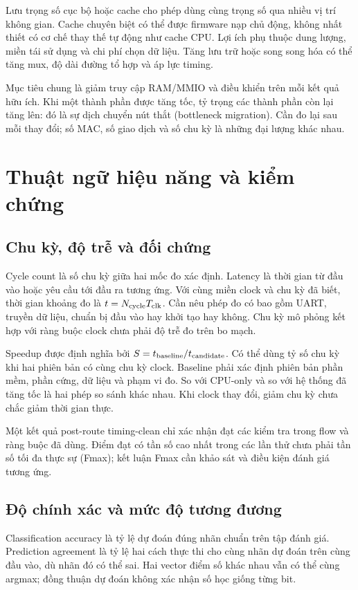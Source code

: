 Lưu trọng số cục bộ hoặc cache cho phép dùng cùng trọng số qua nhiều vị trí không gian. Cache chuyên biệt có thể được firmware nạp chủ động, không nhất thiết có cơ chế thay thế tự động như cache CPU. Lợi ích phụ thuộc dung lượng, miền tái sử dụng và chi phí chọn dữ liệu. Tăng lưu trữ hoặc song song hóa có thể tăng mux, độ dài đường tổ hợp và áp lực timing.

Mục tiêu chung là giảm truy cập RAM/MMIO và điều khiển trên mỗi kết quả hữu ích. Khi một thành phần được tăng tốc, tỷ trọng các thành phần còn lại tăng lên: đó là sự dịch chuyển nút thắt (bottleneck migration). Cần đo lại sau mỗi thay đổi; số MAC, số giao dịch và số chu kỳ là những đại lượng khác nhau.

\section{Thuật ngữ hiệu năng và kiểm chứng}
\subsection{Chu kỳ, độ trễ và đối chứng}
Cycle count là số chu kỳ giữa hai mốc đo xác định. Latency là thời gian từ đầu vào hoặc yêu cầu tới đầu ra tương ứng. Với cùng miền clock và chu kỳ đã biết, thời gian khoảng đo là $t=N_{\rm cycle}T_{\rm clk}$. Cần nêu phép đo có bao gồm UART, truyền dữ liệu, chuẩn bị đầu vào hay khởi tạo hay không. Chu kỳ mô phỏng kết hợp với ràng buộc clock chưa phải độ trễ đo trên bo mạch.

Speedup được định nghĩa bởi $S=t_{\rm baseline}/t_{\rm candidate}$. Có thể dùng tỷ số chu kỳ khi hai phiên bản có cùng chu kỳ clock. Baseline phải xác định phiên bản phần mềm, phần cứng, dữ liệu và phạm vi đo. So với CPU-only và so với hệ thống đã tăng tốc là hai phép so sánh khác nhau. Khi clock thay đổi, giảm chu kỳ chưa chắc giảm thời gian thực.

Một kết quả post-route timing-clean chỉ xác nhận đạt các kiểm tra trong flow và ràng buộc đã dùng. Điểm đạt có tần số cao nhất trong các lần thử chưa phải tần số tối đa thực sự (Fmax); kết luận Fmax cần khảo sát và điều kiện đánh giá tương ứng.

\subsection{Độ chính xác và mức độ tương đương}
Classification accuracy là tỷ lệ dự đoán đúng nhãn chuẩn trên tập đánh giá. Prediction agreement là tỷ lệ hai cách thực thi cho cùng nhãn dự đoán trên cùng đầu vào, dù nhãn đó có thể sai. Hai vector điểm số khác nhau vẫn có thể cùng argmax; đồng thuận dự đoán không xác nhận số học giống từng bit.

